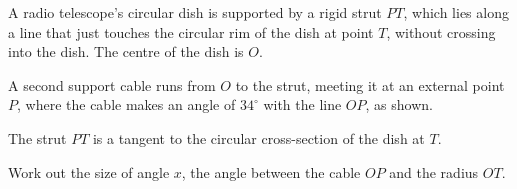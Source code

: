 \begin{question}
\noindent A radio telescope's circular dish is supported by a rigid strut $PT$, which lies along a line that just touches the circular rim of the dish at point $T$, without crossing into the dish. The centre of the dish is $O$.

A second support cable runs from $O$ to the strut, meeting it at an external point $P$, where the cable makes an angle of $34^\circ$ with the line $OP$, as shown.

\begin{center}
\end{center}

\noindent The strut $PT$ is a tangent to the circular cross-section of the dish at $T$.

\noindent Work out the size of angle $x$, the angle between the cable $OP$ and the radius $OT$.

\vspace{4cm}
\begin{flushright}
\end{flushright}
\end{question}
